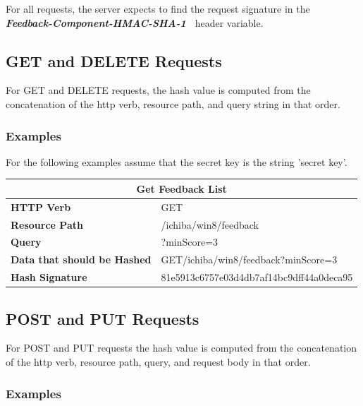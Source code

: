 For all requests, the server expects to find the request signature in the \\
\textbf{\textit{Feedback-Component-HMAC-SHA-1~}}
header variable.

\subsection{GET and DELETE Requests}

For GET and DELETE requests, the hash value is computed from the concatenation
of the http verb, resource path, and query string in that order.
\subsubsection{Examples}

For the following examples assume that the secret key is the string 'secret key'.

\begin{center}
\begin{tabular}{|l||l|}

\hline
\multicolumn{2}{|c|}{\textbf{Get Feedback List}} \\
\hline
\textbf{HTTP Verb}                  & GET \\
\hline
\textbf{Resource Path}              & /ichiba/win8/feedback \\
\hline
\textbf{Query}                      & ?minScore=3 \\
\hline
\textbf{Data that should be Hashed} & GET/ichiba/win8/feedback?minScore=3 \\
\hline
\textbf{Hash Signature}             & 81e5913c6757e03d4db7af14bc9dff44a0deca95 \\
\hline

\end{tabular}
\end{center}

\subsection{POST and PUT Requests}
For POST and PUT requests the hash value is computed from the concatenation
of the http verb, resource path, query, and request body in that order.

\subsubsection{Examples}

